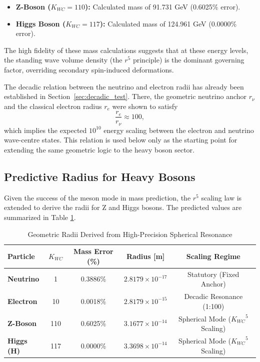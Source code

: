 \documentclass[10pt,a4paper]{article}
\begin{document}
\begin{itemize}
	\item \textbf{Z-Boson ($K_{WC}=110$):} Calculated mass of 91.731 GeV (0.6025\% error).
	\item \textbf{Higgs Boson ($K_{WC}=117$):} Calculated mass of 124.961 GeV (0.0000\% error).
\end{itemize}



The high fidelity of these mass calculations suggests that at these energy levels, the standing wave volume density (the $r^5$ principle) is the dominant governing factor, overriding secondary spin-induced deformations.

The decadic relation between the neutrino and electron radii has already been established in Section~\ref{sec:decadic_test}. There, the geometric neutrino anchor \(r_\nu\) and the classical electron radius \(r_e\) were shown to satisfy
\begin{equation}
	\frac{r_e}{r_\nu} \approx 100,
\end{equation}
which implies the expected \(10^{10}\) energy scaling between the electron and neutrino wave-centre states. This relation is used below only as the starting point for extending the same geometric logic to the heavy boson sector.

\subsection{Predictive Radius for Heavy Bosons}
\label{sub:radius_bosons}
Given the success of the meson mode in mass prediction, the $r^5$ scaling law is extended to derive the radii for Z and Higgs bosons. The predicted values are summarized in Table \ref{tab:radius_summary}.

\begin{table}[ht]
	\centering
	\small
	\caption{Geometric Radii Derived from High-Precision Spherical Resonance}
	\label{tab:radius_summary}
	\begin{tabular}{lcccc}
		\toprule
		\textbf{Particle} & \textbf{\(K_{WC}\)} & \textbf{Mass Error (\%)} & \textbf{Radius [m]} & \textbf{Scaling Regime} \\
		\midrule
		\textbf{Neutrino} & 1 & 0.3886\% & \(2.8179 \times 10^{-17}\) & Statutory (Fixed Anchor) \\
		\textbf{Electron} & 10 & 0.0018\% & \(2.8179 \times 10^{-15}\) & Decadic Resonance (1:100) \\
		\textbf{Z-Boson}  & 110 & 0.6025\% & \(3.1677 \times 10^{-14}\) & Spherical Mode (\({K_{WC}}^5\) Scaling) \\
		\textbf{Higgs (H)} & 117 & 0.0000\% & \(3.3698 \times 10^{-14}\) & Spherical Mode (\({K_{WC}}^5\) Scaling) \\
		\bottomrule
	\end{tabular}
\end{table}
\end{document}
